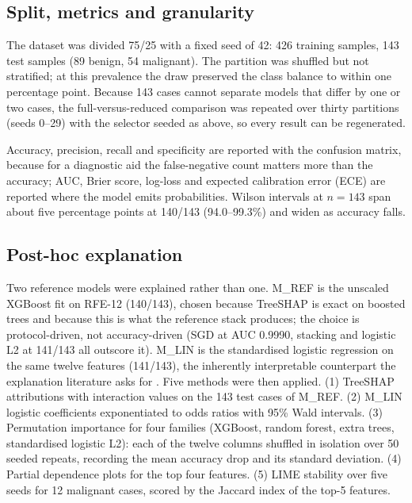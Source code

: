 \documentclass[review,12pt]{elsarticle}
\begin{document}
\subsection{Split, metrics and granularity}

The dataset was divided 75/25 with a fixed seed of 42: 426 training samples, 143 test samples (89 benign, 54 malignant). The partition was shuffled but not stratified; at this prevalence the draw preserved the class balance to within one percentage point. Because 143 cases cannot separate models that differ by one or two cases, the full-versus-reduced comparison was repeated over thirty partitions (seeds 0--29) with the selector seeded as above, so every result can be regenerated.

Accuracy, precision, recall and specificity are reported with the confusion matrix, because for a diagnostic aid the false-negative count matters more than the accuracy; AUC, Brier score, log-loss and expected calibration error (ECE) are reported where the model emits probabilities. Wilson intervals at $n=143$ span about five percentage points at 140/143 (94.0--99.3\%) and widen as accuracy falls.

\subsection{Post-hoc explanation}

Two reference models were explained rather than one. M\_REF is the unscaled XGBoost fit on RFE-12 (140/143), chosen because TreeSHAP is exact on boosted trees and because this is what the reference stack produces; the choice is protocol-driven, not accuracy-driven (SGD at AUC 0.9990, stacking and logistic L2 at 141/143 all outscore it). M\_LIN is the standardised logistic regression on the same twelve features (141/143), the inherently interpretable counterpart the explanation literature asks for \cite{rudin2019stop}. Five methods were then applied. (1) TreeSHAP \cite{lundberg2017shap} attributions with interaction values on the 143 test cases of M\_REF. (2) M\_LIN logistic coefficients exponentiated to odds ratios with 95\% Wald intervals. (3) Permutation importance \cite{altmann2010universal} for four families (XGBoost, random forest, extra trees, standardised logistic L2): each of the twelve columns shuffled in isolation over 50 seeded repeats, recording the mean accuracy drop and its standard deviation. (4) Partial dependence plots \cite{friedman2001greedy} for the top four features. (5) LIME \cite{ribeiro2016lime} stability over five seeds for 12 malignant cases, scored by the Jaccard index of the top-5 features.
\end{document}
